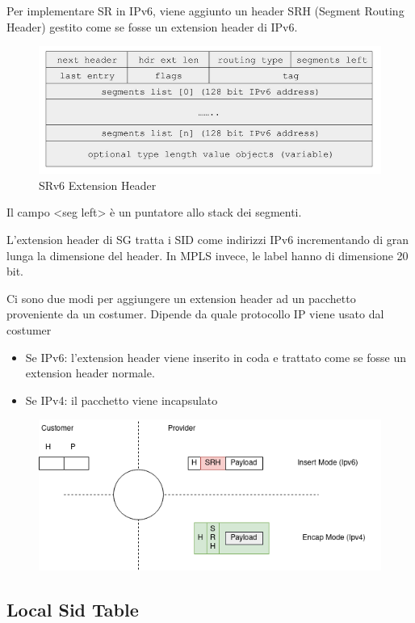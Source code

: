 \documentclass[12pt]{article}
\begin{document}
Per implementare SR in IPv6, viene aggiunto un header SRH (Segment Routing Header) gestito come 
se fosse un extension header di IPv6. 

\begin{figure}[h]
    \includegraphics*[scale = 0.5]{F11.png}
    \caption[short]{SRv6 Extension Header}
    \centering
\end{figure}

Il campo <seg left> è un puntatore allo stack dei segmenti.

L'extension header di SG tratta i SID come indirizzi IPv6 incrementando di gran lunga la dimensione del header.
In MPLS invece, le label hanno di dimensione 20 bit. 

\newpage
Ci sono due modi per aggiungere un extension header ad un 
pacchetto proveniente da un costumer. Dipende da quale protocollo IP viene usato dal costumer 
\begin{itemize}
    \item Se IPv6: l'extension header viene inserito in coda e trattato come se fosse un extension header normale. 
    \item Se IPv4: il pacchetto viene incapsulato  
\end{itemize}


\begin{figure}[h]
    \includegraphics*[scale = 0.5]{F12.png}
    \centering
\end{figure}

\subsection{Local Sid Table}
\end{document}
